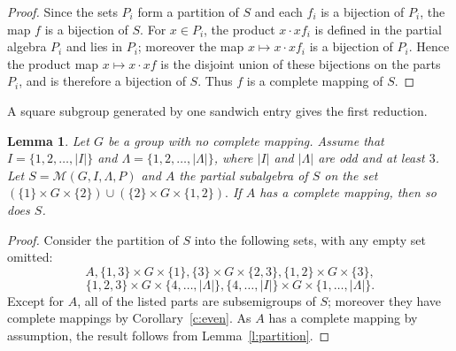 \documentclass[11pt]{article}
\theoremstyle{plain}
\newtheorem{lemma}[theorem]{Lemma}
\theoremstyle{remark}
\theoremstyle{definition}
\theoremstyle{plain}
\begin{document}
\begin{proof}
Since the sets $P_i$ form a partition of $S$ and each $f_i$ is a bijection of
$P_i$, the map $f$ is a bijection of $S$. For $x\in P_i$, the product
$x\cdot xf_i$ is defined in the partial algebra $P_i$ and lies in $P_i$;
moreover the map $x\mapsto x\cdot xf_i$ is a bijection of $P_i$. Hence the
product map $x\mapsto x\cdot xf$ is the disjoint union of these bijections on
the parts $P_i$, and is therefore a bijection of $S$. Thus $f$ is a complete
mapping of $S$.
\end{proof}

A square subgroup generated by one sandwich entry gives the first reduction.

\begin{lemma}\label{l:A-reduct}
Let $G$ be a group with no complete mapping. Assume that $I=\{1,2,\ldots,|I|\}$ and $\Lambda=\{1,2,\ldots,|\Lambda|\}$, where $|I|$ and $|\Lambda|$ are odd and at least $3$.
Let $S=\mathcal{M}(G,I,\Lambda,P)$ and $A$ the partial subalgebra of $S$ on the set
\((\{1\} \times G \times \{2\}) \cup (\{2\} \times G \times \{1,2\}).\)
If $A$ has a complete mapping, then so does $S$.
\end{lemma}
\begin{proof}
Consider the partition of $S$ into the following sets, with any empty set omitted:
\[
A, \{1,3\} \times G \times \{1\}, \{3\} \times G \times \{2,3\}, \{1,2\} \times G \times \{3\},
\]
\[\{1,2,3\} \times G \times \{4,\dots, |\Lambda|\},\{4,\dots,|I|\}\times G \times \{1, \dots, |\Lambda|\}.
\]
Except for $A$, all of the listed parts are subsemigroups of $S$; moreover they have complete mappings by Corollary~\ref{c:even}. As $A$ has a complete mapping by assumption, the result follows from Lemma~\ref{l:partition}.
\end{proof}
\end{document}
